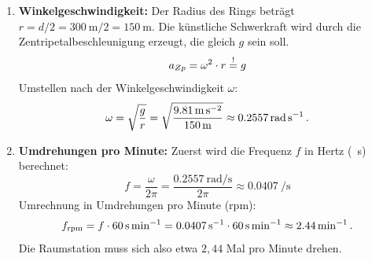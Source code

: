 \documentclass[ngerman]{scrreprt}
\newenvironment{loesungbox}[1]
  {\needspace{5\baselineskip}\begin{loesungboxstyle}[frametitle={#1}]}
  {\end{loesungboxstyle}}
\begin{document}
\begin{loesungbox}{Lösung zu \Cref{aufg:raumstation}}
\begin{enumerate}
    \item \textbf{Winkelgeschwindigkeit:}
    Der Radius des Rings beträgt $r = d/2 = \SI{300}{\metre} / 2 = \SI{150}{\metre}$. Die künstliche Schwerkraft wird durch die Zentripetalbeschleunigung erzeugt, die gleich $g$ sein soll.
    \begin{equation}\label{eq: raumstation_azp}
        a_{Zp} = \omega^2 \cdot r \stackrel{!}{=} g
    \end{equation}
    Umstellen nach der Winkelgeschwindigkeit $\omega$:
    \begin{equation}\label{eq: raumstation_omega}
        \omega = \sqrt{\frac{g}{r}} = \sqrt{\frac{\SI{9.81}{\metre\per\second\squared}}{\SI{150}{\metre}}} \approx \SI{0.2557}{\radian\per\second} \,.
    \end{equation}
    \item \textbf{Umdrehungen pro Minute:}
    Zuerst wird die Frequenz $f$ in Hertz (\si{\per\second}) berechnet:
    \begin{equation}\label{eq: raumstation_frequenz}
        f = \frac{\omega}{2\pi} = \frac{\SI{0.2557}{\radian\per\second}}{2\pi} \approx \SI{0.0407}{\per\second}
    \end{equation}
    Umrechnung in Umdrehungen pro Minute (rpm):
    \begin{equation}\label{eq: raumstation_rpm}
        f_{\text{rpm}} = f \cdot \SI{60}{\second\per\minute} = \SI{0.0407}{\per\second} \cdot \SI{60}{\second\per\minute} \approx \SI{2.44}{\per\minute} \,.
    \end{equation}
    Die Raumstation muss sich also etwa $2,44$ Mal pro Minute drehen.
\end{enumerate}
\end{loesungbox}
\end{document}
